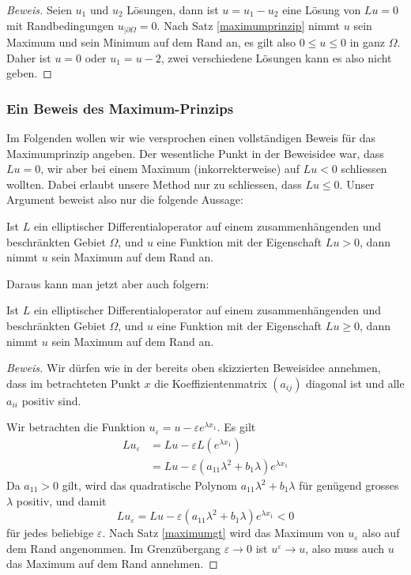 \begin{proof}[Beweis]
Seien $u_1$ und $u_2$ Lösungen, dann ist $u=u_1-u_2$ eine Lösung 
von $Lu=0$ mit Randbedingungen $u_{|\partial\Omega}=0$. Nach Satz
\ref{maximumprinzip} nimmt $u$ sein Maximum und sein Minimum auf dem Rand an,
es gilt
also $0\le u\le 0$ in ganz $\Omega$.
Daher ist $u=0$ oder $u_1=u-2$,
zwei verschiedene Lösungen kann es also nicht geben.
\end{proof}

{\small
\subsubsection{Ein Beweis des Maximum-Prinzips}
Im Folgenden wollen wir wie versprochen einen vollständigen Beweis für das
Maximumprinzip angeben. Der wesentliche Punkt in der Beweisidee
war, dass $Lu=0$, wir aber bei einem Maximum (inkorrekterweise)
auf $Lu<0$ schliessen wollten. Dabei erlaubt unsere Method nur zu
schliessen, dass $Lu\le 0$.
Unser Argument beweist also nur die folgende Aussage:
\begin{satz}
\label{maximumgt}
Ist $L$ ein elliptischer Differentialoperator auf einem zusammenhängenden
und beschränkten Gebiet $\Omega$,
und $u$ eine Funktion mit der Eigenschaft $Lu>0$,
dann nimmt $u$ sein Maximum auf dem Rand an.
\end{satz}

Daraus kann man jetzt aber auch folgern:
\begin{satz}
Ist $L$ ein elliptischer Differentialoperator auf einem zusammenhängenden
und beschränkten Gebiet $\Omega$,
und $u$ eine Funktion mit der Eigenschaft $Lu\ge0$,
dann nimmt $u$ sein Maximum auf dem Rand an.
\end{satz}

\begin{proof}[Beweis]
Wir dürfen wie in der bereits oben skizzierten Beweisidee annehmen,
dass im betrachteten Punkt $x$ die Koeffizientenmatrix $(a_{ij})$
diagonal ist und alle $a_{ii}$ positiv sind.

Wir betrachten die Funktion $u_{\varepsilon}=u-\varepsilon e^{\lambda x_1}$.
Es gilt
\begin{align*}
Lu_{\varepsilon}&=Lu-\varepsilon L(e^{\lambda x_1})\\
&=Lu-\varepsilon(a_{11}\lambda^2+b_1\lambda)e^{\lambda x_1}
\end{align*}
Da $a_{11}>0$ gilt, wird das quadratische Polynom $a_{11}\lambda^2+b_1\lambda$
für genügend grosses $\lambda$ positiv, und damit 
\[
Lu_{\varepsilon}= Lu-\varepsilon(a_{11}\lambda^2+b_1\lambda)e^{\lambda x_1}<0
\]
für jedes beliebige $\varepsilon$. Nach Satz \ref{maximumgt} wird das Maximum
von $u_\varepsilon$ also auf dem Rand angenommen.
Im Grenzübergang $\varepsilon\to 0$ ist $u^\varepsilon\to u$, also
muss auch $u$ das Maximum auf dem Rand annehmen.
\end{proof}

}
